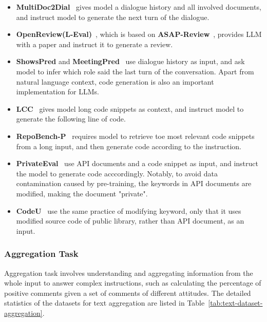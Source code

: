 \begin{itemize}[leftmargin=10pt]
    \item \textbf{MultiDoc2Dial}~\cite{feng_multidoc2dial:_2021} gives model a dialogue history and all involved documents, and instruct model to generate the next turn of the dialogue.
    \item \textbf{OpenReview(L-Eval)}~\cite{an_l-eval:_2023}, which is based on \textbf{ASAP-Review}~\cite{yuan_can_asap_review_2021}, provides LLM with a paper and instruct it to generate a review.
    \item \textbf{ShowsPred} and \textbf{MeetingPred}~\cite{dong2023bamboo} use dialogue history as input, and ask model to infer which role said the last turn of the conversation. Apart from natural language context, code generation is also an important implementation for LLMs.
    \item \textbf{LCC}~\cite{guo_longcoder_lcc:_2023} gives model long code snippets as context, and instruct model to generate the following line of code.
    \item \textbf{RepoBench-P}~\cite{liu_repobench:_2023} requires model to retrieve toe most relevant code snippets from a long input, and then generate code according to the instruction.
    \item \textbf{PrivateEval}~\cite{dong2023bamboo} use API documents and a code snippet as input, and instruct the model to generate 
code acccordingly. Notably, to avoid data contamination caused by pre-training, the keywords in API documents are modified, making the document "private".
\item \textbf{CodeU}~\cite{dong2023bamboo} use the same practice of modifying keyword, only that it uses modified source code of public library, rather than API document, as an input. 
\end{itemize}



\subsubsection{Aggregation Task}
Aggregation task involves understanding and aggregating information from the whole input to answer complex instructions, such as calculating the percentage of positive comments given a set of comments of different attitudes. 
The detailed statistics of the datasets for text aggregation are listed in Table~\ref{tab:text-dataset-aggregation}.

